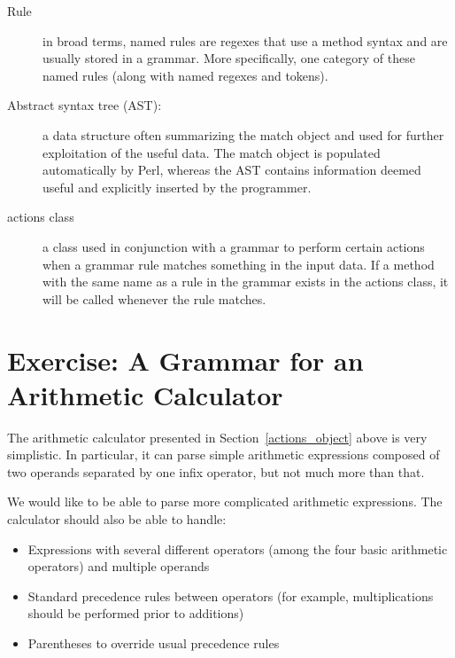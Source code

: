 \begin{description}
\item[Rule] in broad terms, named rules are regexes that use a 
method syntax and are usually stored in a grammar. More specifically, 
one category of these named rules (along with named regexes and 
tokens).

\item[Abstract syntax tree (AST):] a data structure often 
summarizing the match object and used for further exploitation 
of the useful data. The match object is populated automatically 
by Perl, whereas the AST contains information deemed useful and 
explicitly inserted by the programmer.

\item[actions class] a class used in conjunction with a grammar 
to perform certain actions when a grammar rule matches 
something in the input data. If a method with the same name 
as a rule in the grammar exists in the actions class, it will 
be called whenever the rule matches.

\end{description}

\section{Exercise: A Grammar for an Arithmetic Calculator}
\label{calculator}

The arithmetic calculator presented in Section~\ref{actions_object} 
above is very simplistic. In particular, it can parse simple 
arithmetic expressions composed of two operands separated by 
one infix operator, but not much more than that.

We would like to be able to parse more complicated arithmetic 
expressions. The calculator should also be able to handle:
\begin{itemize}
\item Expressions with several different operators (among the four 
basic arithmetic operators) and multiple operands
\item Standard precedence rules between operators (for example,
multiplications should be performed prior to additions)
\item Parentheses to override usual precedence rules
\end{itemize}

